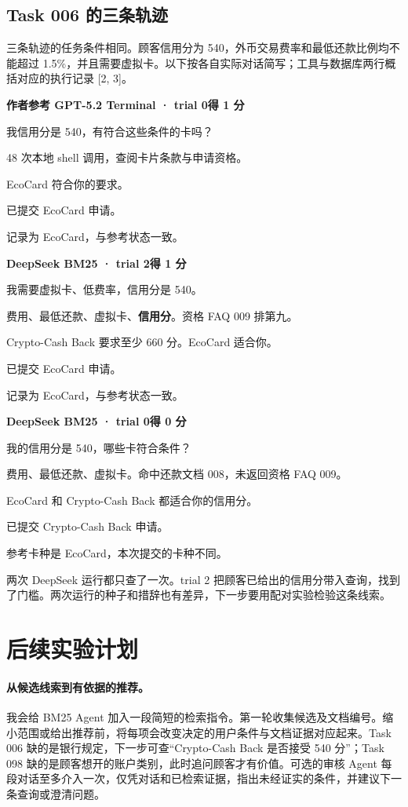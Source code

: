 \documentclass{article}
\newenvironment{tracecard}[2]{\par\addvspace{5pt}\noindent\begin{minipage}{\linewidth}
  \setlength{\parindent}{0pt}\small
  \colorbox{cardwash}{\parbox{\dimexpr\linewidth-2\fboxsep\relax}{\strut\textcolor{cardink}{\bfseries #1}\hfill #2}}\par\smallskip
}{\end{minipage}\par\addvspace{4pt}}
\newcommand{\turnline}[2]{\noindent\makebox[.17\linewidth][l]{\textcolor{cardink}{\bfseries #1}}\parbox[t]{.83\linewidth}{#2\strut}\par}
\begin{document}
\subsection{Task 006 的三条轨迹}
三条轨迹的任务条件相同。顾客信用分为 540，外币交易费率和最低还款比例均不能超过 1.5\%，并且需要虚拟卡。以下按各自实际对话简写；工具与数据库两行概括对应的执行记录 [2, 3]。

\begin{tracecard}{作者参考 \enspace GPT-5.2 Terminal · trial 0}{\textcolor{cardpass}{\bfseries 得 1 分}}
\turnline{顾客}{我信用分是 540，有符合这些条件的卡吗？}
\turnline{工具}{48 次本地 shell 调用，查阅卡片条款与申请资格。}
\turnline{客服}{EcoCard 符合你的要求。}
\turnline{用户工具}{已提交 EcoCard 申请。}
\turnline{数据库}{记录为 EcoCard，与参考状态一致。}
\end{tracecard}

\begin{tracecard}{DeepSeek \enspace BM25 · trial 2}{\textcolor{cardpass}{\bfseries 得 1 分}}
\turnline{顾客}{我需要虚拟卡、低费率，信用分是 540。}
\turnline{检索}{费用、最低还款、虚拟卡、\textbf{信用分}。资格 FAQ 009 排第九。}
\turnline{客服}{Crypto-Cash Back 要求至少 660 分。EcoCard 适合你。}
\turnline{用户工具}{已提交 EcoCard 申请。}
\turnline{数据库}{记录为 EcoCard，与参考状态一致。}
\end{tracecard}

\begin{tracecard}{DeepSeek \enspace BM25 · trial 0}{\textcolor{cardfail}{\bfseries 得 0 分}}
\turnline{顾客}{我的信用分是 540，哪些卡符合条件？}
\turnline{检索}{费用、最低还款、虚拟卡。命中还款文档 008，未返回资格 FAQ 009。}
\turnline{客服}{EcoCard 和 Crypto-Cash Back 都适合你的信用分。}
\turnline{用户工具}{已提交 Crypto-Cash Back 申请。}
\turnline{数据库}{参考卡种是 EcoCard，本次提交的卡种不同。}
\end{tracecard}

两次 DeepSeek 运行都只查了一次。trial 2 把顾客已给出的信用分带入查询，找到了门槛。两次运行的种子和措辞也有差异，下一步要用配对实验检验这条线索。

\section{后续实验计划}
\paragraph{从候选线索到有依据的推荐。} 我会给 BM25 Agent 加入一段简短的检索指令。第一轮收集候选及文档编号。缩小范围或给出推荐前，将每项会改变决定的用户条件与文档证据对应起来。Task 006 缺的是银行规定，下一步可查“Crypto-Cash Back 是否接受 540 分”；Task 098 缺的是顾客想开的账户类别，此时追问顾客才有价值。可选的审核 Agent 每段对话至多介入一次，仅凭对话和已检索证据，指出未经证实的条件，并建议下一条查询或澄清问题。
\end{document}
